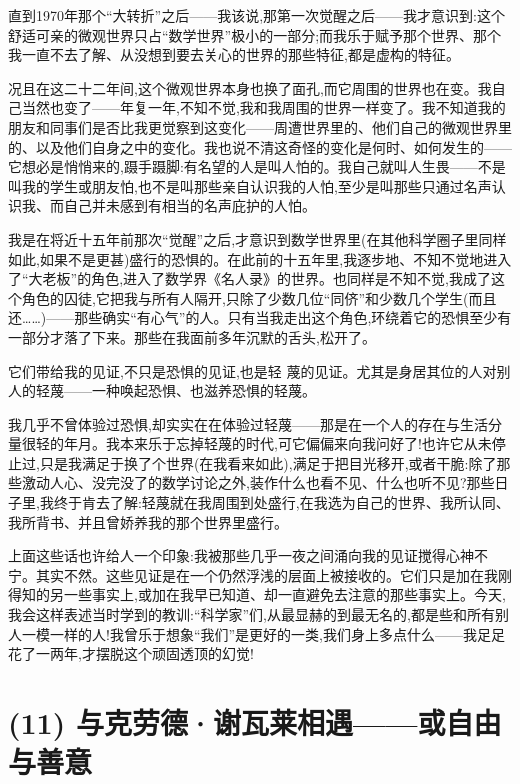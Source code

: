 直到1970年那个“大转折”之后——我该说,那第一次觉醒之后——我才意识到:这个舒适可亲的微观世界只占“数学世界”极小的一部分;而我乐于赋予那个世界、那个我一直不去了解、从没想到要去关心的世界的那些特征,都是虚构的特征。

况且在这二十二年间,这个微观世界本身也换了面孔,而它周围的世界也在变。我自己当然也变了——年复一年,不知不觉,我和我周围的世界一样变了。我不知道我的朋友和同事们是否比我更觉察到这变化——周遭世界里的、他们自己的微观世界里的、以及他们自身之中的变化。我也说不清这奇怪的变化是何时、如何发生的——它想必是悄悄来的,蹑手蹑脚:有名望的人是叫人怕的。我自己就叫人生畏——不是叫我的学生或朋友怕,也不是叫那些亲自认识我的人怕,至少是叫那些只通过名声认识我、而自己并未感到有相当的名声庇护的人怕。

我是在将近十五年前那次“觉醒”之后,才意识到数学世界里(在其他科学圈子里同样如此,如果不是更甚)盛行的恐惧的。在此前的十五年里,我逐步地、不知不觉地进入了“大老板”的角色,进入了数学界《名人录》的世界。也同样是不知不觉,我成了这个角色的囚徒,它把我与所有人隔开,只除了少数几位“同侪”和少数几个学生(而且还……)——那些确实“有心气”的人。只有当我走出这个角色,环绕着它的恐惧至少有一部分才落了下来。那些在我面前多年沉默的舌头,松开了。

它们带给我的见证,不只是恐惧的见证,也是轻
 蔑的见证。尤其是身居其位的人对别人的轻蔑——一种唤起恐惧、也滋养恐惧的轻蔑。

我几乎不曾体验过恐惧,却实实在在体验过轻蔑——那是在一个人的存在与生活分量很轻的年月。我本来乐于忘掉轻蔑的时代,可它偏偏来向我问好了!也许它从未停止过,只是我满足于换了个世界(在我看来如此),满足于把目光移开,或者干脆:除了那些激动人心、没完没了的数学讨论之外,装作什么也看不见、什么也听不见?那些日子里,我终于肯去了解:轻蔑就在我周围到处盛行,在我选为自己的世界、我所认同、我所背书、并且曾娇养我的那个世界里盛行。

上面这些话也许给人一个印象:我被那些几乎一夜之间涌向我的见证搅得心神不宁。其实不然。这些见证是在一个仍然浮浅的层面上被接收的。它们只是加在我刚得知的另一些事实上,或加在我早已知道、却一直避免去注意的那些事实上。今天,我会这样表述当时学到的教训:“科学家”们,从最显赫的到最无名的,都是些和所有别人一模一样的人!我曾乐于想象“我们”是更好的一类,我们身上多点什么——我足足花了一两年,才摆脱这个顽固透顶的幻觉!

\section{(11) 与克劳德·谢瓦莱相遇——或自由与善意}

